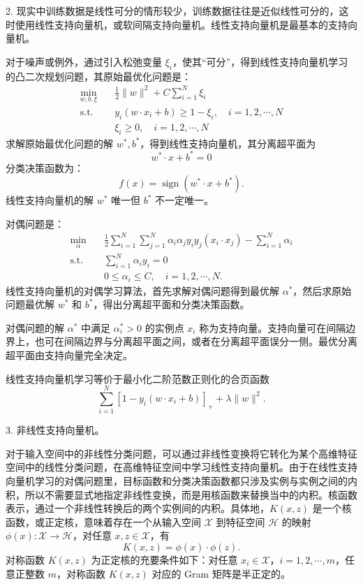 \documentclass[UTF8,12pt,a4paper,fontset=fandol]{ctexart}
\begin{document}
2. 现实中训练数据是线性可分的情形较少，训练数据往往是近似线性可分的，这时使用线性支持向量机，或软间隔支持向量机。线性支持向量机是最基本的支持向量机。

对于噪声或例外，通过引入松弛变量 $\xi_i$，使其“可分”，得到线性支持向量机学习的凸二次规划问题，其原始最优化问题是：
\[
\begin{aligned}
\min_{w,b,\xi}\quad & \frac{1}{2}\|w\|^2+C\sum_{i=1}^N\xi_i\\
\mathrm{s.t.}\quad & y_i(w\cdot x_i+b)\geq 1-\xi_i,\quad i=1,2,\cdots,N\\
& \xi_i\geq 0,\quad i=1,2,\cdots,N
\end{aligned}
\]
求解原始最优化问题的解 $w^*,b^*$，得到线性支持向量机，其分离超平面为
\[
w^*\cdot x+b^*=0
\]
分类决策函数为：
\[
f(x)=\operatorname{sign}(w^*\cdot x+b^*).
\]
线性支持向量机的解 $w^*$ 唯一但 $b^*$ 不一定唯一。

对偶问题是：
\[
\begin{aligned}
\min_\alpha\quad & \frac{1}{2}\sum_{i=1}^N\sum_{j=1}^N\alpha_i\alpha_j y_i y_j(x_i\cdot x_j)-\sum_{i=1}^N\alpha_i\\
\mathrm{s.t.}\quad & \sum_{i=1}^N\alpha_i y_i=0\\
& 0\leq \alpha_i\leq C,\quad i=1,2,\cdots,N.
\end{aligned}
\]
线性支持向量机的对偶学习算法，首先求解对偶问题得到最优解 $\alpha^*$，然后求原始问题最优解 $w^*$ 和 $b^*$，得出分离超平面和分类决策函数。

对偶问题的解 $\alpha^*$ 中满足 $\alpha_i^*>0$ 的实例点 $x_i$ 称为支持向量。支持向量可在间隔边界上，也可在间隔边界与分离超平面之间，或者在分离超平面误分一侧。最优分离超平面由支持向量完全决定。

线性支持向量机学习等价于最小化二阶范数正则化的合页函数
\[
\sum_{i=1}^N[1-y_i(w\cdot x_i+b)]_++\lambda\|w\|^2.
\]

3. 非线性支持向量机。

对于输入空间中的非线性分类问题，可以通过非线性变换将它转化为某个高维特征空间中的线性分类问题，在高维特征空间中学习线性支持向量机。由于在线性支持向量机学习的对偶问题里，目标函数和分类决策函数都只涉及实例与实例之间的内积，所以不需要显式地指定非线性变换，而是用核函数来替换当中的内积。核函数表示，通过一个非线性转换后的两个实例间的内积。具体地，$K(x,z)$ 是一个核函数，或正定核，意味着存在一个从输入空间 $\mathcal{X}$ 到特征空间 $\mathcal{H}$ 的映射 $\phi(x):\mathcal{X}\to\mathcal{H}$，对任意 $x,z\in\mathcal{X}$，有
\[
K(x,z)=\phi(x)\cdot\phi(z).
\]
对称函数 $K(x,z)$ 为正定核的充要条件如下：对任意 $x_i\in\mathcal{X}$，$i=1,2,\cdots,m$，任意正整数 $m$，对称函数 $K(x,z)$ 对应的 Gram 矩阵是半正定的。
\end{document}
